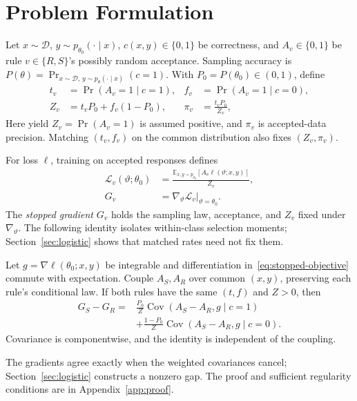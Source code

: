 \section{Problem Formulation}
\label{sec:formulation}

Let $x\sim\mathcal D$, $y\sim p_{\theta_0}(\cdot\mid x)$,
$c(x,y)\in\{0,1\}$ be correctness, and $A_v\in\{0,1\}$ be rule
$v\in\{R,S\}$'s possibly random acceptance. Sampling accuracy is
$P(\theta)=\Pr_{x\sim\mathcal D,\,y\sim p_\theta(\cdot\mid x)}(c=1)$.
With $P_0=P(\theta_0)\in(0,1)$, define
\begin{align}
 t_v&=\Pr(A_v=1\mid c=1),&
 f_v&=\Pr(A_v=1\mid c=0),\nonumber\\
 Z_v&=t_vP_0+f_v(1-P_0),&
 \pi_v&=\frac{t_vP_0}{Z_v},\label{eq:rates}
\end{align}
Here yield $Z_v=\Pr(A_v=1)$ is assumed positive, and $\pi_v$ is
accepted-data precision. Matching $(t_v,f_v)$ on the common distribution
also fixes $(Z_v,\pi_v)$.

For loss $\ell$, training on accepted responses defines
\begin{equation}
 \begin{aligned}
 \mathcal L_v(\vartheta;\theta_0)
 &=\frac{\mathbb E_{x,y\sim p_{\theta_0}}[A_v\ell(\vartheta;x,y)]}{Z_v},\\
 G_v&=\left.\nabla_\vartheta\mathcal L_v\right|_{\vartheta=\theta_0}.
 \end{aligned}
 \label{eq:stopped-objective}
\end{equation}
The \emph{stopped gradient} $G_v$ holds the sampling law, acceptance, and
$Z_v$ fixed under $\nabla_\vartheta$. The following identity isolates
within-class selection moments; Section~\ref{sec:logistic} shows that
matched rates need not fix them.

\begin{lemma}
\label{lem:influence}
Let $g=\nabla\ell(\theta_0;x,y)$ be integrable and differentiation
in~\eqref{eq:stopped-objective} commute with expectation. Couple $A_S,A_R$
over common $(x,y)$, preserving each rule's conditional law.
If both rules have the same $(t,f)$ and $Z>0$, then
\begin{equation}
 \begin{split}
 G_S-G_R={}&\frac{P_0}{Z}\operatorname{Cov}(A_S-A_R,g\mid c=1)\\
 &+\frac{1-P_0}{Z}\operatorname{Cov}(A_S-A_R,g\mid c=0).
 \end{split}
 \label{eq:influence-gap}
\end{equation}
Covariance is componentwise, and the identity is independent of the coupling.
\end{lemma}
The gradients agree exactly when the weighted covariances cancel;
Section~\ref{sec:logistic} constructs a nonzero gap. The proof and sufficient
regularity conditions are in Appendix~\ref{app:proof}.

